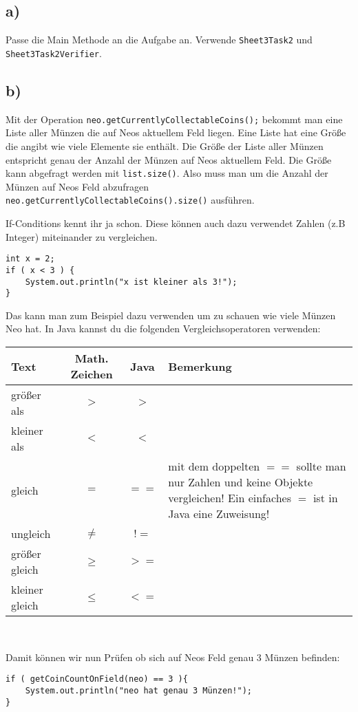 	\subsection*{a)}
		Passe die Main Methode an die Aufgabe an. Verwende \lstinline{Sheet3Task2} und \lstinline{Sheet3Task2Verifier}.
	\subsection*{b)}
		Mit der Operation \lstinline{neo.getCurrentlyCollectableCoins();} bekommt man eine Liste aller Münzen die auf Neos aktuellem Feld liegen. Eine Liste hat eine Größe die angibt wie viele Elemente sie enthält. Die Größe der Liste aller Münzen entspricht genau der Anzahl der Münzen auf Neos aktuellem Feld. Die Größe kann abgefragt werden mit \lstinline{list.size()}. Also muss man um die Anzahl der Münzen auf Neos Feld abzufragen \lstinline{neo.getCurrentlyCollectableCoins().size()} ausführen.

\begin{Infobox}[If-Conditions 2]
If-Conditions kennt ihr ja schon. Diese können auch dazu verwendet Zahlen (z.B Integer) miteinander zu vergleichen.
\begin{lstlisting}
int x = 2;
if ( x < 3 ) {
	System.out.println("x ist kleiner als 3!");
}
\end{lstlisting}
Das kann man zum Beispiel dazu verwenden um zu schauen wie viele Münzen Neo hat. In Java kannst du die folgenden Vergleichsoperatoren verwenden:
\begin{center}
        \begin{tabular}{ l | c | c | l }
                Text & Math. Zeichen & Java & Bemerkung\\
            \hline
                  gr\"oßer als & $>$ & $>$ & \\
                  kleiner als & $<$ & $<$ & \\
                  gleich & $=$ & $==$ & mit dem doppelten $==$ sollte man nur Zahlen und keine Objekte vergleichen! Ein einfaches $=$ ist in Java eine Zuweisung!\\

                  ungleich & $\neq$ & $!=$ & \\
                  gr\"oßer gleich & $\geq$ & $>=$ &  \\

                  kleiner gleich & $\leq$ & $<=$ &  \\
        \end{tabular} \\
\end{center}

Damit können wir nun Prüfen ob sich auf Neos Feld genau 3 Münzen befinden:
\begin{lstlisting}
if ( getCoinCountOnField(neo) == 3 ){
	System.out.println("neo hat genau 3 Münzen!");
}
\end{lstlisting}
\end{Infobox}



